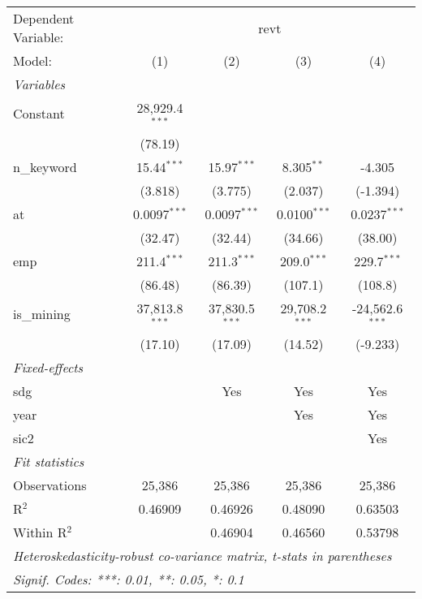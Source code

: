 
\begingroup
\centering
\begin{tabular}{lcccc}
   \tabularnewline \midrule \midrule
   Dependent Variable: & \multicolumn{4}{c}{revt}\\
   Model:       & (1)              & (2)              & (3)              & (4)\\  
   \midrule
   \emph{Variables}\\
   Constant     & 28,929.4$^{***}$ &                  &                  &   \\   
                & (78.19)          &                  &                  &   \\   
   n\_keyword   & 15.44$^{***}$    & 15.97$^{***}$    & 8.305$^{**}$     & -4.305\\   
                & (3.818)          & (3.775)          & (2.037)          & (-1.394)\\   
   at           & 0.0097$^{***}$   & 0.0097$^{***}$   & 0.0100$^{***}$   & 0.0237$^{***}$\\   
                & (32.47)          & (32.44)          & (34.66)          & (38.00)\\   
   emp          & 211.4$^{***}$    & 211.3$^{***}$    & 209.0$^{***}$    & 229.7$^{***}$\\   
                & (86.48)          & (86.39)          & (107.1)          & (108.8)\\   
   is\_mining   & 37,813.8$^{***}$ & 37,830.5$^{***}$ & 29,708.2$^{***}$ & -24,562.6$^{***}$\\   
                & (17.10)          & (17.09)          & (14.52)          & (-9.233)\\   
   \midrule
   \emph{Fixed-effects}\\
   sdg          &                  & Yes              & Yes              & Yes\\  
   year         &                  &                  & Yes              & Yes\\  
   sic2         &                  &                  &                  & Yes\\  
   \midrule
   \emph{Fit statistics}\\
   Observations & 25,386           & 25,386           & 25,386           & 25,386\\  
   R$^2$        & 0.46909          & 0.46926          & 0.48090          & 0.63503\\  
   Within R$^2$ &                  & 0.46904          & 0.46560          & 0.53798\\  
   \midrule \midrule
   \multicolumn{5}{l}{\emph{Heteroskedasticity-robust co-variance matrix, t-stats in parentheses}}\\
   \multicolumn{5}{l}{\emph{Signif. Codes: ***: 0.01, **: 0.05, *: 0.1}}\\
\end{tabular}
\par\endgroup



